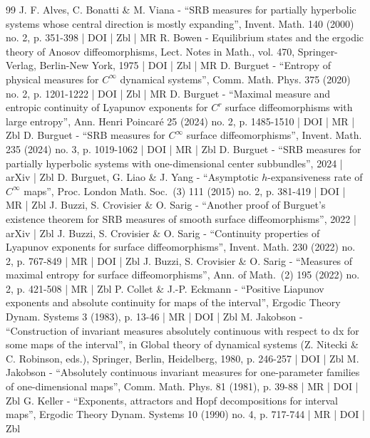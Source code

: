 \begin{thebibliography}{99}
J. F. Alves, C. Bonatti \& M. Viana - “SRB measures for partially hyperbolic systems whose central direction is mostly expanding”, Invent. Math. 140 (2000) no. 2, p. 351-398 | DOI | Zbl | MR
R. Bowen - Equilibrium states and the ergodic theory of Anosov diffeomorphisms, Lect. Notes in Math., vol. 470, Springer-Verlag, Berlin-New York, 1975 | DOI | Zbl | MR
D. Burguet - “Entropy of physical measures for $C^\infty $ dynamical systems”, Comm. Math. Phys. 375 (2020) no. 2, p. 1201-1222 | DOI | Zbl | MR
D. Burguet - “Maximal measure and entropic continuity of Lyapunov exponents for $C^r$ surface diffeomorphisms with large entropy”, Ann. Henri Poincaré 25 (2024) no. 2, p. 1485-1510 | DOI | MR | Zbl
D. Burguet - “SRB measures for $C^\infty $ surface diffeomorphisms”, Invent. Math. 235 (2024) no. 3, p. 1019-1062 | DOI | MR | Zbl
D. Burguet - “SRB measures for partially hyperbolic systems with one-dimensional center subbundles”, 2024 | arXiv | Zbl
D. Burguet, G. Liao \& J. Yang - “Asymptotic $h$-expansiveness rate of $C^\infty $ maps”, Proc. London Math. Soc. (3) 111 (2015) no. 2, p. 381-419 | DOI | MR | Zbl
J. Buzzi, S. Crovisier \& O. Sarig - “Another proof of Burguet’s existence theorem for SRB measures of smooth surface diffeomorphisms”, 2022 | arXiv | Zbl
J. Buzzi, S. Crovisier \& O. Sarig - “Continuity properties of Lyapunov exponents for surface diffeomorphisms”, Invent. Math. 230 (2022) no. 2, p. 767-849 | MR | DOI | Zbl
J. Buzzi, S. Crovisier \& O. Sarig - “Measures of maximal entropy for surface diffeomorphisms”, Ann. of Math. (2) 195 (2022) no. 2, p. 421-508 | MR | Zbl
P. Collet \& J.-P. Eckmann - “Positive Liapunov exponents and absolute continuity for maps of the interval”, Ergodic Theory Dynam. Systems 3 (1983), p. 13-46 | MR | DOI | Zbl
M. Jakobson - “Construction of invariant measures absolutely continuous with respect to dx for some maps of the interval”, in Global theory of dynamical systems (Z. Nitecki \& C. Robinson, eds.), Springer, Berlin, Heidelberg, 1980, p. 246-257 | DOI | Zbl
M. Jakobson - “Absolutely continuous invariant measures for one-parameter families of one-dimensional maps”, Comm. Math. Phys. 81 (1981), p. 39-88 | MR | DOI | Zbl
G. Keller - “Exponents, attractors and Hopf decompositions for interval maps”, Ergodic Theory Dynam. Systems 10 (1990) no. 4, p. 717-744 | MR | DOI | Zbl

\end{thebibliography}
